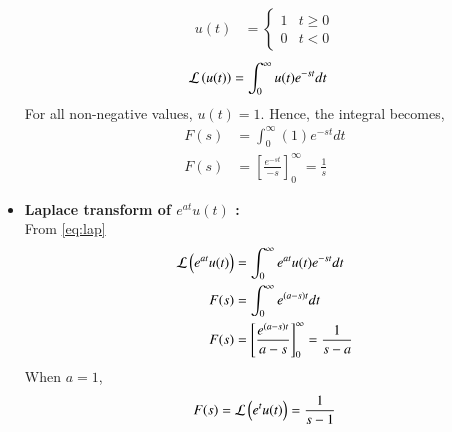 \documentclass[journal]{IEEEtran}
\begin{document}
\begin{itemize}
		\begin{align}
			u(t) &= 
			\begin{cases} 
			1 & t \geq 0 \\
			0 & t < 0
			\end{cases} 
		\end{align}
		\begin{align}
			\mathcal{L} \left(u(t)\right) &= \int_{0}^{\infty} u(t) e^{-st} dt 
		\end{align}
		For all non-negative values, $u(t) = 1$. Hence, the integral becomes,
		\begin{align}
			F(s) &= \int_{0}^{\infty} (1)e^{-st} dt \\
			F(s) &= \left[ \frac{e^{-st}}{-s} \right]_{0}^{\infty} = \frac{1}{s} \label{eq:first}
		\end{align}
	\item \textbf{Laplace transform of $e^{at} u(t)$ :} \\
		From \eqref{eq:lap}
		\begin{align}
			\mathcal{L} \left(e^{at} u(t)\right) &= \int_{0}^{\infty} e^{at} u(t) e^{-st} dt \\
			F(s) &= \int_{0}^{\infty} e^{(a-s)t} dt \\
			F(s) &= \left[\frac{e^{(a-s)t}}{a-s} \right]_{0}^{\infty} = \frac{1}{s-a} 
		\end{align}
		When $a=1$, 
		\begin{align}
			F(s) = \mathcal{L} \left(e^t u(t)\right) = \frac{1}{s-1} \label{eq:second} 
		\end{align}
\end{itemize}
\end{document}
